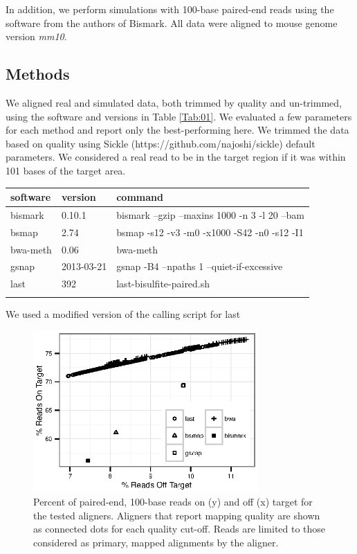 \documentclass{bioinfo}
\begin{document}
In addition, we perform simulations with 100-base paired-end reads using
the software from the authors of Bismark. All data were aligned to mouse
genome version \textit{mm10}.


\begin{methods}
\section{Methods}
We aligned real and simulated data, both trimmed by quality and
un-trimmed, using the software and versions in Table \ref{Tab:01}.
We evaluated a few parameters for each method and report only the
best-performing here. We trimmed the data based on quality
using Sickle (https://github.com/najoshi/sickle) default parameters.
We considered a real read to be in the target region if it
was within 101 bases of the target area. 

\begin{table}[!t]
{\begin{tabular}{lll}\toprule
software & version & command\\\midrule
bismark & 0.10.1 & bismark --gzip --maxins 1000 -n 3 -l 20 --bam\\
bsmap & 2.74 & bsmap -s12 -v3 -m0 -x1000 -S42 -n0 -s12 -I1\\
bwa-meth & 0.06 & bwa-meth\\
gsnap & 2013-03-21 & gsnap -B4 --npaths 1 --quiet-if-excessive\\
last & 392 & last-bisulfite-paired.sh\\\botrule
\end{tabular}}{We used a modified version of the calling script for last}
\end{table}

\end{methods}

\begin{figure}[!tpb]%
    \centerline{\includegraphics[width=86mm]{qual-plot-real}}
    \caption{Percent of paired-end, 100-base reads on (y) and off (x) target for the tested aligners. Aligners that report mapping quality are shown as connected dots for each quality cut-off. Reads are limited to those considered as primary, mapped alignments by the aligner.}\label{fig:01}
\end{figure}
\end{document}
